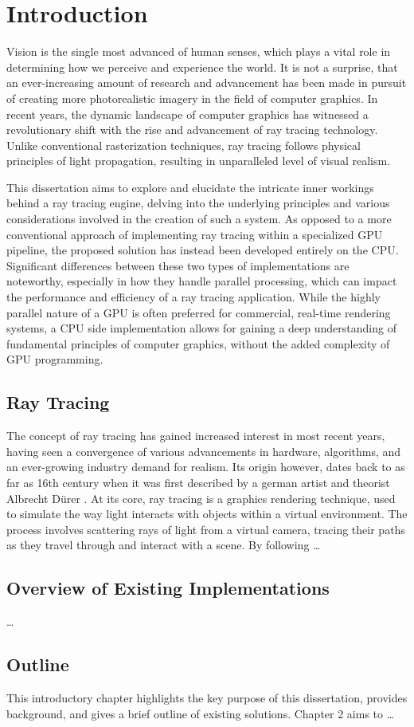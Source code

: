 \chapter{Introduction}

Vision is the single most advanced of human senses, which plays a vital role in determining how we perceive and experience the world.
It is not a surprise, that an ever-increasing amount of research and advancement has been made in pursuit of creating more photorealistic imagery in the field of computer graphics. 
In recent years, the dynamic landscape of computer graphics has witnessed a revolutionary shift with the rise and advancement of ray tracing technology. 
Unlike conventional rasterization techniques, ray tracing follows physical principles of light propagation, resulting in unparalleled level of visual realism. 

This dissertation aims to explore and elucidate the intricate inner workings behind a ray tracing engine, delving into the underlying principles and various considerations involved in the creation of such a system.
As opposed to a more conventional approach of implementing ray tracing within a specialized GPU pipeline, the proposed solution has instead been developed entirely on the CPU. 
Significant differences between these two types of implementations are noteworthy, especially in how they handle parallel processing, which can impact the performance and efficiency of a ray tracing application. 
While the highly parallel nature of a GPU is often preferred for commercial, real-time rendering systems, a CPU side implementation allows for gaining a deep understanding of fundamental principles of computer graphics, without the added complexity of GPU programming.

\section{Ray Tracing}

The concept of ray tracing has gained increased interest in most recent years, having seen a convergence of various advancements in hardware, algorithms, and an ever-growing industry demand for realism.
Its origin however, dates back to as far as 16th century when it was first described by a german artist and theorist Albrecht Dürer \supercite{Hofmann1990}.
At its core, ray tracing is a graphics rendering technique, used to simulate the way light interacts with objects within a virtual environment. 
The process involves scattering rays of light from a virtual camera, tracing their paths as they travel through and interact with a scene. By following \dots

\section{Overview of Existing Implementations}

\dots

\section{Outline}

This introductory chapter highlights the key purpose of this dissertation, provides background, and gives a brief outline of existing solutions. 
Chapter 2 aims to \dots